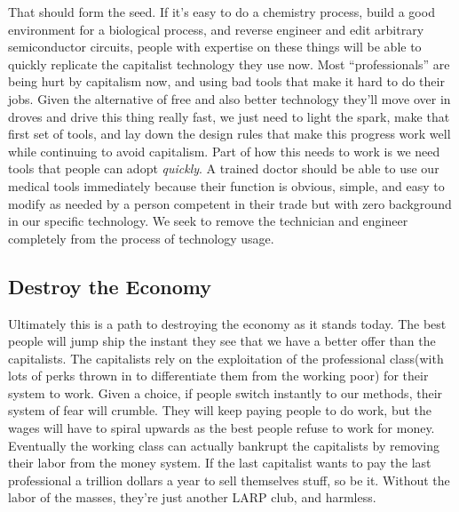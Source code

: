 That should form the seed. If it's easy to do a chemistry process, build
a good environment for a biological process, and reverse engineer and
edit arbitrary semiconductor circuits, people with expertise on these
things will be able to quickly replicate the capitalist technology they
use now. Most ``professionals'' are being hurt by capitalism now, and
using bad tools that make it hard to do their jobs. Given the
alternative of free and also better technology they'll move over in
droves and drive this thing really fast, we just need to light the
spark, make that first set of tools, and lay down the design rules that
make this progress work well while continuing to avoid capitalism. Part
of how this needs to work is we need tools that people can adopt
\emph{quickly}. A trained doctor should be able to use our medical tools
immediately because their function is obvious, simple, and easy to
modify as needed by a person competent in their trade but with zero
background in our specific technology. We seek to remove the technician
and engineer completely from the process of technology usage.

\subsection{Destroy the Economy}\label{destroy-the-economy}

Ultimately this is a path to destroying the economy as it stands today.
The best people will jump ship the instant they see that we have a
better offer than the capitalists. The capitalists rely on the
exploitation of the professional class(with lots of perks thrown in to
differentiate them from the working poor) for their system to work.
Given a choice, if people switch instantly to our methods, their system
of fear will crumble. They will keep paying people to do work, but the
wages will have to spiral upwards as the best people refuse to work for
money. Eventually the working class can actually bankrupt the
capitalists by removing their labor from the money system. If the last
capitalist wants to pay the last professional a trillion dollars a year
to sell themselves stuff, so be it. Without the labor of the masses,
they're just another LARP club, and harmless.

